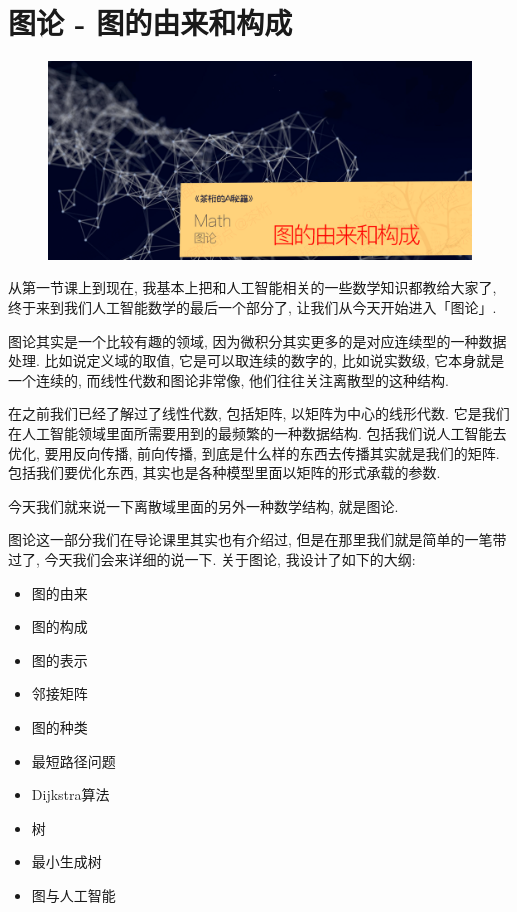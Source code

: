 \chapter{图论 - 图的由来和构成}

\begin{figure}[ht]
  \centering
  \includegraphics[width=1\textwidth]{asset/茶桁的AI秘籍_Math_23.png}
\end{figure}

\newpage

从第一节课上到现在, 我基本上把和人工智能相关的一些数学知识都教给大家了, 终于来到我们人工智能数学的最后一个部分了, 让我们从今天开始进入「图论」. 

图论其实是一个比较有趣的领域, 因为微积分其实更多的是对应连续型的一种数据处理. 比如说定义域的取值, 它是可以取连续的数字的, 比如说实数级, 它本身就是一个连续的, 而线性代数和图论非常像, 他们往往关注离散型的这种结构. 

在之前我们已经了解过了线性代数, 包括矩阵, 以矩阵为中心的线形代数. 它是我们在人工智能领域里面所需要用到的最频繁的一种数据结构. 包括我们说人工智能去优化, 要用反向传播, 前向传播, 到底是什么样的东西去传播其实就是我们的矩阵. 包括我们要优化东西, 其实也是各种模型里面以矩阵的形式承载的参数. 

今天我们就来说一下离散域里面的另外一种数学结构, 就是图论. 

图论这一部分我们在导论课里其实也有介绍过, 但是在那里我们就是简单的一笔带过了, 今天我们会来详细的说一下. 关于图论, 我设计了如下的大纲: 

\begin{itemize}
  \item 图的由来
  \item 图的构成
  \item 图的表示
  \item 邻接矩阵
  \item 图的种类
  \item 最短路径问题
  \item Dijkstra算法
  \item 树
  \item 最小生成树
  \item 图与人工智能
\end{itemize}

